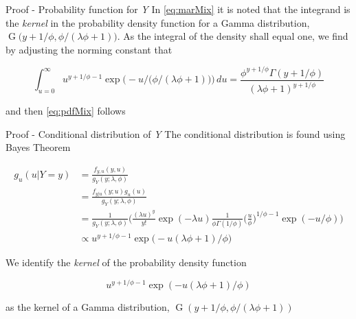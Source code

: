 \documentclass[aspectratio=169]{beamer}
\DeclareMathOperator{\G}{G}
\begin{document}
\begin{frame}{Proof - Probability function for \emph{Y}}
\protect\hypertarget{proof---probability-function-for-y-2}{}
In \eqref{eq:marMix} it is noted that the integrand is the \emph{kernel}
in the probability density function for a Gamma distribution,
\(\G\big(y+1/\phi,\phi/(\lambda \phi+1)\big)\). As the integral of the
density shall equal one, we find by adjusting the norming constant that

\begin{equation}
  \int_{u=0}^\infty u^{y+1/\phi-1} \exp \bigg(-u/\Big(\phi/(\lambda \phi+1)\Big)\bigg) \,du = \frac{\phi^{y+1/\phi}\Gamma(y+1/\phi)}{(\lambda \phi + 1)^{y+1/\phi}}
\end{equation}

and then \eqref{eq:pdfMix} follows
\end{frame}

\begin{frame}{Proof - Conditional distribution of \emph{Y}}
\protect\hypertarget{proof---conditional-distribution-of-y}{}
The conditional distribution is found using Bayes Theorem

\begin{equation}
  \begin{aligned}
    g_{u}(u|Y=y)&=\frac{f_{y,u}(y,u)}{g_Y(y;\lambda, \phi)} \\
    &=\frac{f_{y|u}(y;u)g_{u}(u)}{g_{Y}(y;\lambda,\phi)} \\
    &=\frac{1}{g_{Y}(y;\lambda,\phi)}\bigg(\frac{(\lambda u)^y}{y!} \exp (-\lambda u) \frac{1}{\phi \Gamma(1/\phi)} \bigg(\frac{u}{\phi}\bigg)^{1/\phi-1} \exp (-u/\phi)\bigg) \\
    &\propto u^{y+1/\phi-1} \exp \big(- u(\lambda\phi+1)/\phi\big)
  \end{aligned}
\end{equation}

We identify the \emph{kernel} of the probability density function

\begin{equation}
  u^{y+1/\phi-1} \exp (- u(\lambda\phi+1)/\phi)
\end{equation}

as the kernel of a Gamma distribution,
\(\G(y+1/\phi,\phi/(\lambda\phi+1))\)
\end{frame}
\end{document}
